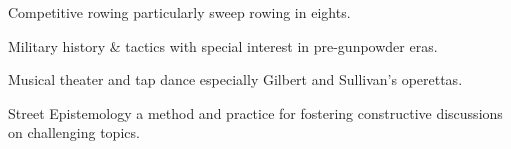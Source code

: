 


    

\begin{cvhonors}

    \cvhonor
        {Competitive rowing} %
        {particularly sweep rowing in eights.} %
        {} %
        {\textbullet} %
    
    \cvhonor
        {Military history \& tactics} %
        {with special interest in pre-gunpowder eras.} %
        {} %
        {\textbullet} %

    \cvhonor
        {Musical theater and tap dance} %
        {especially Gilbert and Sullivan’s operettas.} %
        {} %
        {\textbullet} %

    \cvhonor
        {Street Epistemology} %
        {a method and practice for fostering constructive discussions on challenging topics.} %
        {} %
        {\textbullet} %
    \end{cvhonors}